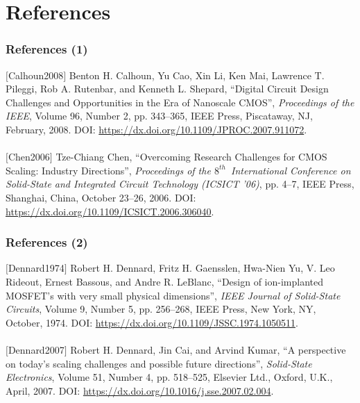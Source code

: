 \section*{References}











\begin{frame}
	\frametitle{References (1)}
	
	$[$Calhoun2008$]$ Benton H. Calhoun, Yu Cao, Xin Li, Ken Mai, Lawrence T. Pileggi, Rob A. Rutenbar, and Kenneth L. Shepard, ``Digital Circuit Design Challenges and Opportunities in the Era of Nanoscale {CMOS}'', {\it Proceedings of the {IEEE}}, Volume 96, Number 2, pp. 343--365, {IEEE} Press, Piscataway, {NJ}, February, 2008. DOI: \url{https://dx.doi.org/10.1109/JPROC.2007.911072}. \\
	\ \\
	$[$Chen2006$]$ Tze-Chiang Chen, ``Overcoming Research Challenges for {CMOS} Scaling: Industry Directions'', {\it Proceedings of the $8^{th}$\ International Conference on Solid-State and Integrated Circuit Technology ({ICSICT '06})}, pp. 4--7, {IEEE} Press, Shanghai, China, October 23--26, 2006. DOI: \url{https://dx.doi.org/10.1109/ICSICT.2006.306040}. \\

\end{frame}











\begin{frame}
	\frametitle{References (2)}

	$[$Dennard1974$]$ Robert H. Dennard, Fritz H. Gaensslen, Hwa-Nien Yu, V. Leo Rideout, Ernest Bassous, and Andre R. {LeBlanc}, ``Design of ion-implanted {MOSFET}'s with very small physical dimensions'', {\it {IEEE} Journal of Solid-State Circuits}, Volume 9, Number 5, pp. 256--268, {IEEE} Press, New York, {NY}, October, 1974. DOI: \url{https://dx.doi.org/10.1109/JSSC.1974.1050511}. \\
	\ \\
	$[$Dennard2007$]$ Robert H. Dennard, Jin Cai, and Arvind Kumar, ``A perspective on today's scaling challenges and possible future directions'', {\it Solid-State Electronics}, Volume 51, Number 4, pp. 518--525, Elsevier Ltd., Oxford, {U.K.}, April, 2007. DOI: \url{https://dx.doi.org/10.1016/j.sse.2007.02.004}. \\


\end{frame}





